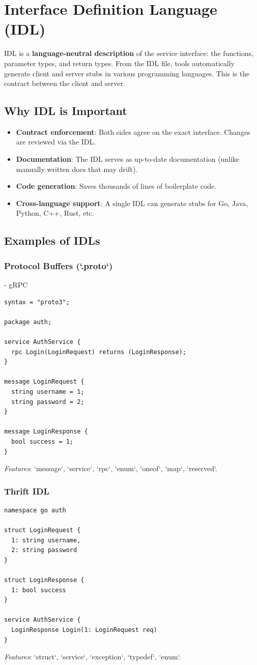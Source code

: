 \documentclass[10pt,a4paper]{article}
\begin{document}
\section{Interface Definition Language (IDL)}
IDL is a \textbf{language-neutral description} of the service interface: the functions, parameter types, and return types. From the IDL file, tools automatically generate client and server stubs in various programming languages. This is the contract between the client and server.

\subsection{Why IDL is Important}
\begin{itemize}
    \item \textbf{Contract enforcement}: Both sides agree on the exact interface. Changes are reviewed via the IDL.
    \item \textbf{Documentation}: The IDL serves as up-to-date documentation (unlike manually written docs that may drift).
    \item \textbf{Code generation}: Saves thousands of lines of boilerplate code.
    \item \textbf{Cross-language support}: A single IDL can generate stubs for Go, Java, Python, C++, Rust, etc.
\end{itemize}

\subsection{Examples of IDLs}

\subsubsection{Protocol Buffers (`.proto`)} - gRPC
\begin{lstlisting}
syntax = "proto3";

package auth;

service AuthService {
  rpc Login(LoginRequest) returns (LoginResponse);
}

message LoginRequest {
  string username = 1;
  string password = 2;
}

message LoginResponse {
  bool success = 1;
}
\end{lstlisting}
\textit{Features}: `message`, `service`, `rpc`, `enum`, `oneof`, `map`, `reserved`.

\subsubsection{Thrift IDL}
\begin{lstlisting}
namespace go auth

struct LoginRequest {
  1: string username,
  2: string password
}

struct LoginResponse {
  1: bool success
}

service AuthService {
  LoginResponse Login(1: LoginRequest req)
}
\end{lstlisting}
\textit{Features}: `struct`, `service`, `exception`, `typedef`, `enum`.
\end{document}
